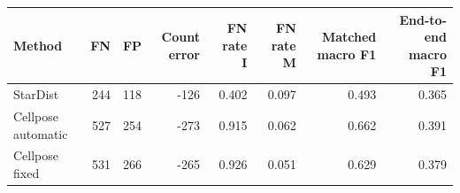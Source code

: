 \begin{tabular}{lrrrrrrr}
\toprule
Method & FN & FP & Count error & FN rate I & FN rate M & Matched macro F1 & End-to-end macro F1 \\
\midrule
StarDist & 244 & 118 & -126 & 0.402 & 0.097 & 0.493 & 0.365 \\
Cellpose automatic & 527 & 254 & -273 & 0.915 & 0.062 & 0.662 & 0.391 \\
Cellpose fixed & 531 & 266 & -265 & 0.926 & 0.051 & 0.629 & 0.379 \\
\bottomrule
\end{tabular}
